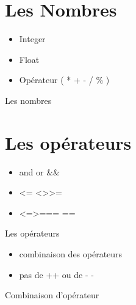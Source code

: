 \documentclass{beamer}
\begin{document}
\section{Les Nombres}

\begin{frame}
  \begin{itemize}
    \item Integer
    \item Float
    \item Op\'erateur ( * + - / \% )
  \end{itemize}
\end{frame}

\begin{frame}
  \begin{beamerboxesrounded}{Les nombres}
    
  \end{beamerboxesrounded}
\end{frame}

\section{Les opérateurs}

\begin{frame}
  \begin{itemize}
    \item and or \&\& \textbar\textbar
    \item \textless= \textless \textgreater \textgreater=
    \item \textless=\textgreater === ==
  \end{itemize}
\end{frame}

\begin{frame}
  \begin{beamerboxesrounded}{Les op\'erateurs}
    
  \end{beamerboxesrounded}
\end{frame}

\begin{frame}
  \begin{itemize}
    \item combinaison des op\'erateurs
    \item pas de ++ ou de - -
  \end{itemize}
\end{frame}

\begin{frame}
  \begin{beamerboxesrounded}{Combinaison d'op\'erateur}
    
  \end{beamerboxesrounded}
\end{frame}
\end{document}
